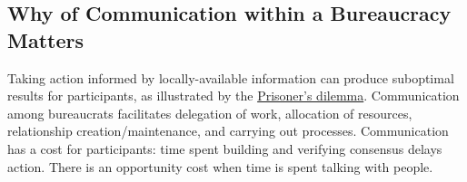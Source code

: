\subsection{Why of Communication within a Bureaucracy Matters}

Taking action informed by locally-available information can produce suboptimal results for participants, as illustrated by the \href{https://en.wikipedia.org/wiki/Prisoner\%27s\_dilemma}{Prisoner's dilemma}. Communication among bureaucrats facilitates delegation of work, allocation of resources, relationship creation/maintenance, and carrying out processes. Communication has a cost for participants: time spent building and verifying consensus delays action. There is an opportunity cost when time is spent talking with people.




